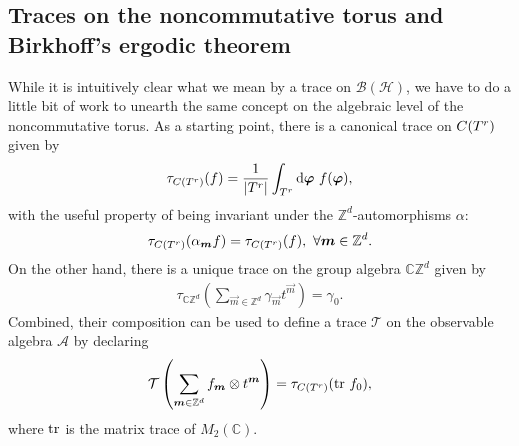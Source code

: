 \documentclass[submission, Phys]{SciPost}
\begin{document}
\subsection{Traces on the noncommutative torus and Birkhoff's ergodic theorem}
\label{subsec:ergodicity}

While it is intuitively clear what we mean by a trace on $\mathcal{B}(\mathcal{H})$, we have to do a little bit of work to unearth the same concept on the algebraic level of the noncommutative torus.
As a starting point, there is a canonical trace on $C(T^r)$ given by
\begin{align}
    \tau_{C(T^r)}(f) = \frac{1}{|T^r|} \int_{T^r}\mathrm{d} \boldsymbol{\varphi} ~ f( \boldsymbol{\varphi}),
\end{align}
with the useful property of being invariant under the $\mathbb{Z}^d$-automorphisms $\alpha$: 
\begin{equation}
    \tau_{C(T^r)}(\alpha_{\boldsymbol{m}}f) = \tau_{C(T^r)}(f), ~ \forall  \boldsymbol{m}\in \mathbb{Z}^d .
\end{equation}
On the other hand, there is a unique trace on the group algebra $\mathbb{C}\mathbb{Z}^d$ given by
\begin{align}
     \tau_{\mathbb{C}\mathbb{Z}^d}\left( \sum_{\vec{m}\in\mathbb{Z}^d} \gamma_{\vec{m}} t^{\vec{m}}\right) = \gamma_0 .
\end{align}
Combined, their composition can be used to define a trace $\mathcal{T}$ on the observable algebra $\mathcal{A}$  by declaring 
\begin{align}
   \mathcal{T}\left( \sum_{\boldsymbol{m} \in \mathbb{Z}^d} f_{\boldsymbol{m}} \otimes t^{\boldsymbol{m}} \right) = \tau_{C(T^r)}(\mathrm{tr}~f_0) ,
\end{align}
where $\mathrm{tr}$ is the matrix trace of $M_2(\mathbb{C})$.

\end{document}
